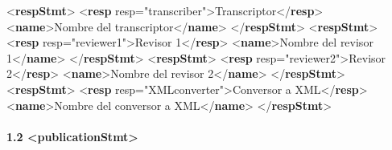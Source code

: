 \documentclass[
]{book}
\newenvironment{Shaded}{\begin{snugshade}}{\end{snugshade}}
\newcommand{\KeywordTok}[1]{\textcolor[rgb]{0.13,0.29,0.53}{\textbf{#1}}}
\newcommand{\NormalTok}[1]{#1}
\newcommand{\OtherTok}[1]{\textcolor[rgb]{0.56,0.35,0.01}{#1}}
\newcommand{\StringTok}[1]{\textcolor[rgb]{0.31,0.60,0.02}{#1}}
\begin{document}
\begin{Shaded}
\begin{Highlighting}[]
\NormalTok{\textless{}}\KeywordTok{respStmt}\NormalTok{\textgreater{} }
\NormalTok{            \textless{}}\KeywordTok{resp}\OtherTok{ resp=}\StringTok{"transcriber"}\NormalTok{\textgreater{}Transcriptor\textless{}/}\KeywordTok{resp}\NormalTok{\textgreater{} }
\NormalTok{            \textless{}}\KeywordTok{name}\NormalTok{\textgreater{}Nombre del transcriptor\textless{}/}\KeywordTok{name}\NormalTok{\textgreater{} }
\NormalTok{         \textless{}/}\KeywordTok{respStmt}\NormalTok{\textgreater{}}
\NormalTok{         \textless{}}\KeywordTok{respStmt}\NormalTok{\textgreater{}}
\NormalTok{            \textless{}}\KeywordTok{resp}\OtherTok{ resp=}\StringTok{"reviewer1"}\NormalTok{\textgreater{}Revisor 1\textless{}/}\KeywordTok{resp}\NormalTok{\textgreater{}}
\NormalTok{            \textless{}}\KeywordTok{name}\NormalTok{\textgreater{}Nombre del revisor 1\textless{}/}\KeywordTok{name}\NormalTok{\textgreater{}}
\NormalTok{         \textless{}/}\KeywordTok{respStmt}\NormalTok{\textgreater{}}
\NormalTok{         \textless{}}\KeywordTok{respStmt}\NormalTok{\textgreater{}}
\NormalTok{            \textless{}}\KeywordTok{resp}\OtherTok{ resp=}\StringTok{"reviewer2"}\NormalTok{\textgreater{}Revisor 2\textless{}/}\KeywordTok{resp}\NormalTok{\textgreater{}}
\NormalTok{            \textless{}}\KeywordTok{name}\NormalTok{\textgreater{}Nombre del revisor 2\textless{}/}\KeywordTok{name}\NormalTok{\textgreater{}}
\NormalTok{         \textless{}/}\KeywordTok{respStmt}\NormalTok{\textgreater{}}
\NormalTok{         \textless{}}\KeywordTok{respStmt}\NormalTok{\textgreater{}}
\NormalTok{            \textless{}}\KeywordTok{resp}\OtherTok{ resp=}\StringTok{"XMLconverter"}\NormalTok{\textgreater{}Conversor a XML\textless{}/}\KeywordTok{resp}\NormalTok{\textgreater{}}
\NormalTok{            \textless{}}\KeywordTok{name}\NormalTok{\textgreater{}Nombre del conversor a XML\textless{}/}\KeywordTok{name}\NormalTok{\textgreater{}}
\NormalTok{\textless{}/}\KeywordTok{respStmt}\NormalTok{\textgreater{}}
\end{Highlighting}
\end{Shaded}

\hypertarget{publicationstmt}{%
\paragraph*{\texorpdfstring{1.2 { \textless publicationStmt\textgreater{} }}{1.2  \textless publicationStmt\textgreater{} }}\label{publicationstmt}}
\end{document}
